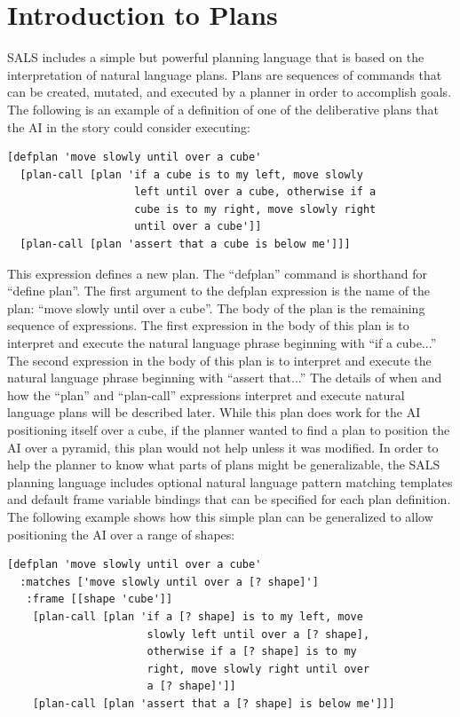 \section{Introduction to Plans}

SALS includes a simple but powerful planning language that is based on
the interpretation of natural language plans.  Plans are sequences of
commands that can be created, mutated, and executed by a planner in
order to accomplish goals.  The following is an example of a
definition of one of the deliberative plans that the AI in the story
could consider executing:
\begin{samepage}
\begin{Verbatim}
[defplan 'move slowly until over a cube'
  [plan-call [plan 'if a cube is to my left, move slowly
                    left until over a cube, otherwise if a
                    cube is to my right, move slowly right
                    until over a cube']]
  [plan-call [plan 'assert that a cube is below me']]]
\end{Verbatim}
\end{samepage}
This expression defines a new plan.  The ``defplan'' command is
shorthand for ``define plan''.  The first argument to the defplan
expression is the name of the plan: ``move slowly until over a cube''.
The body of the plan is the remaining sequence of expressions.  The
first expression in the body of this plan is to interpret and execute
the natural language phrase beginning with ``if a cube...''  The
second expression in the body of this plan is to interpret and execute
the natural language phrase beginning with ``assert that...''  The
details of when and how the ``plan'' and ``plan-call'' expressions
interpret and execute natural language plans will be described later.
While this plan does work for the AI positioning itself over a cube,
if the planner wanted to find a plan to position the AI over a
pyramid, this plan would not help unless it was modified.  In order to
help the planner to know what parts of plans might be generalizable,
the SALS planning language includes optional natural language pattern
matching templates and default frame variable bindings that can be
specified for each plan definition.  The following example shows how
this simple plan can be generalized to allow positioning the AI over a
range of shapes:
\begin{samepage}
\begin{Verbatim}
[defplan 'move slowly until over a cube'
  :matches ['move slowly until over a [? shape]']
   :frame [[shape 'cube']]
    [plan-call [plan 'if a [? shape] is to my left, move
                      slowly left until over a [? shape],
                      otherwise if a [? shape] is to my
                      right, move slowly right until over
                      a [? shape]']]
    [plan-call [plan 'assert that a [? shape] is below me']]]
\end{Verbatim}
\end{samepage}

